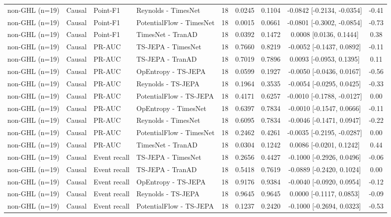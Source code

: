 \begin{table}[t]
\begin{tabular}{@{}llllccccc@{}}
non-GHL (n=19) & Causal & Point-F1 & Reynolds - TimesNet & 18 & 0.0245 & 0.1104 & -0.0842 [-0.2134, -0.0354] & -0.41 \\
non-GHL (n=19) & Causal & Point-F1 & PotentialFlow - TimesNet & 18 & 0.0015 & 0.0661 & -0.0801 [-0.3002, -0.0854] & -0.73 \\
non-GHL (n=19) & Causal & Point-F1 & TimesNet - TranAD & 18 & 0.0392 & 0.1472 & 0.0008 [0.0136, 0.1444] & 0.38 \\
non-GHL (n=19) & Causal & PR-AUC & TS-JEPA - TimesNet & 18 & 0.7660 & 0.8219 & -0.0052 [-0.1437, 0.0892] & -0.11 \\
non-GHL (n=19) & Causal & PR-AUC & TS-JEPA - TranAD & 18 & 0.7019 & 0.7896 & 0.0093 [-0.0953, 0.1395] & 0.11 \\
non-GHL (n=19) & Causal & PR-AUC & OpEntropy - TS-JEPA & 18 & 0.0599 & 0.1927 & -0.0050 [-0.0436, 0.0167] & -0.56 \\
non-GHL (n=19) & Causal & PR-AUC & Reynolds - TS-JEPA & 18 & 0.1964 & 0.3535 & -0.0054 [-0.0295, 0.0425] & -0.33 \\
non-GHL (n=19) & Causal & PR-AUC & PotentialFlow - TS-JEPA & 18 & 0.4171 & 0.6257 & -0.0010 [-0.1788, -0.0127] & 0.00 \\
non-GHL (n=19) & Causal & PR-AUC & OpEntropy - TimesNet & 18 & 0.6397 & 0.7834 & -0.0010 [-0.1547, 0.0666] & -0.11 \\
non-GHL (n=19) & Causal & PR-AUC & Reynolds - TimesNet & 18 & 0.6095 & 0.7834 & -0.0046 [-0.1471, 0.0947] & -0.22 \\
non-GHL (n=19) & Causal & PR-AUC & PotentialFlow - TimesNet & 18 & 0.2462 & 0.4261 & -0.0035 [-0.2195, -0.0287] & 0.00 \\
non-GHL (n=19) & Causal & PR-AUC & TimesNet - TranAD & 18 & 0.0304 & 0.1242 & 0.0086 [-0.0201, 0.1242] & 0.44 \\
non-GHL (n=19) & Causal & Event recall & TS-JEPA - TimesNet & 18 & 0.2656 & 0.4427 & -0.1000 [-0.2926, 0.0496] & -0.06 \\
non-GHL (n=19) & Causal & Event recall & TS-JEPA - TranAD & 18 & 0.5418 & 0.7619 & -0.0889 [-0.2420, 0.1024] & 0.00 \\
non-GHL (n=19) & Causal & Event recall & OpEntropy - TS-JEPA & 18 & 0.9176 & 0.9384 & -0.0040 [-0.0920, 0.0954] & -0.12 \\
non-GHL (n=19) & Causal & Event recall & Reynolds - TS-JEPA & 18 & 0.9645 & 0.9645 & 0.0000 [-0.1117, 0.0853] & -0.09 \\
non-GHL (n=19) & Causal & Event recall & PotentialFlow - TS-JEPA & 18 & 0.1237 & 0.2420 & -0.1000 [-0.2694, 0.0323] & -0.53 \\

\end{tabular}
\end{table}
